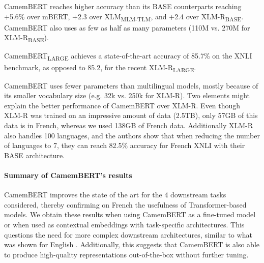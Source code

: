 \documentclass[11pt,a4paper]{article}
\newcommand{\camembert}{CamemBERT\xspace}
\newcommand{\camembertccnetlarge}{CamemBERT\textsubscript{LARGE}\xspace}
\newcommand{\mbert}{mBERT\xspace}
\newcommand{\xlmmlmtlm}{XLM\textsubscript{MLM-TLM}\xspace}
\begin{document}
\camembert reaches higher accuracy than its BASE counterparts reaching +5.6\% over \mbert, +2.3 over \xlmmlmtlm, and +2.4 over XLM-R\textsubscript{BASE}. \camembert also uses as few as half as many parameters (110M vs. 270M for XLM-R\textsubscript{BASE}).

\camembertccnetlarge achieves a state-of-the-art accuracy of 85.7\% on the XNLI benchmark, as opposed to 85.2, for the recent XLM-R\textsubscript{LARGE}.

\camembert uses fewer parameters than multilingual models, mostly because of its smaller vocabulary size (e.g. 32k vs. 250k for XLM-R).
Two elements might explain the better performance of \camembert over XLM-R.
Even though XLM-R was trained on an impressive amount of data (2.5TB), only 57GB of this data is in French, whereas we used 138GB of French data.
Additionally XLM-R also handles 100 languages, and the authors show that when reducing the number of languages to 7, they can reach 82.5\% accuracy for French XNLI with their BASE architecture.



\paragraph{Summary of \camembert's results}
\camembert improves the state of the art for the 4 downstream tasks considered, thereby confirming on French the usefulness of Transformer-based models. We obtain these results when using \camembert as a fine-tuned model or when used as contextual embeddings with task-specific architectures.
This questions the need for more complex downstream architectures, similar to what was shown for English \cite{devlin2019bert}.
Additionally, this suggests that \camembert is also able to produce high-quality representations out-of-the-box without further tuning.
\end{document}
